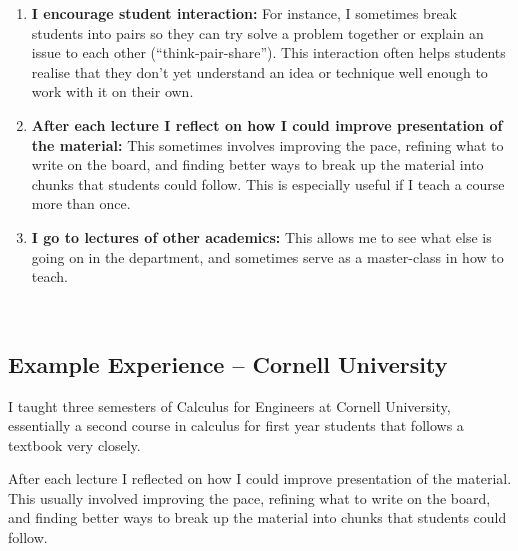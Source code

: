 \documentclass[10,a4paper,sans]{moderncv}
\begin{document}
\begin{enumerate}
 
 \item \textbf{I encourage student interaction:} For instance, I sometimes break students into pairs so they can try solve a problem together or explain an issue to each other (``think-pair-share''). This interaction often helps students realise that they don't yet understand an idea or technique well enough to work with it on their own. 
 
 
 \item \textbf{After each lecture I reflect on how I could improve presentation of the material:} This sometimes involves improving the pace, refining what to write on the board, and finding better ways to break up the material into chunks that students could follow. This is especially useful if I teach a course more than once.
 
 \item \textbf{I go to lectures of other academics:} This allows me to see what else is going on in the department, and sometimes serve as a master-class in how to teach.
 

\end{enumerate}

 
 


\


\subsection{Example Experience -- Cornell University}

I taught three semesters of Calculus for Engineers at Cornell University, essentially a second course in calculus for first year students that follows a textbook very closely. 

After each lecture I reflected on how I could improve presentation of the material. This usually involved improving the pace, refining what to write on the board, and finding better ways to break up the material into chunks that students could follow.
\end{document}
